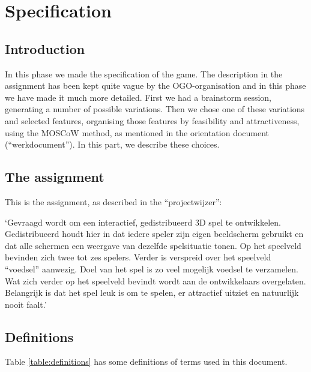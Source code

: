 \chapter{Specification} %
\label{cha:specification}

\section{Introduction}
In this phase we made the specification of the game. The description in the assignment has been kept quite vague by the OGO-organisation and in this phase we have made it much more detailed. First we had a brainstorm session, generating a number of possible variations. Then we chose one of these variations and selected features, organising those features by feasibility and attractiveness, using the MOSCoW method, as mentioned in the orientation document (``werkdocument''). In this part, we describe these choices.

\section{The assignment}
This is the assignment, as described in the ``projectwijzer'':

`Gevraagd wordt om een interactief, gedistribueerd 3D spel te
ontwikkelen. Gedistribueerd houdt hier in dat iedere speler zijn eigen
beeldscherm gebruikt en dat alle schermen een weergave van dezelfde
spelsituatie tonen. Op het speelveld bevinden zich twee tot zes spelers.
Verder is verspreid over het speelveld ``voedsel'' aanwezig. Doel van het
spel is zo veel mogelijk voedsel te verzamelen. Wat zich verder op het
speelveld bevindt wordt aan de ontwikkelaars overgelaten. Belangrijk is
dat het spel leuk is om te spelen, er attractief uitziet en natuurlijk nooit
faalt.'

\section{Definitions} %
\label{sec:definitions}
Table \ref{table:definitions} has some definitions of terms used in this document.


